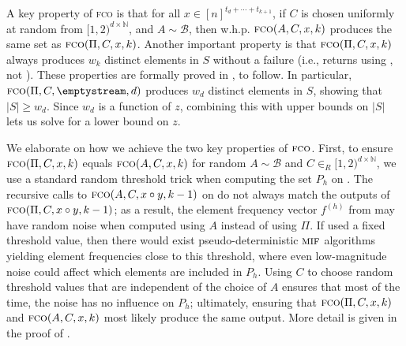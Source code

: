 \documentclass[10pt,a4paper]{article}
\theoremstyle{definition}
\theoremstyle{remark}
\newcommand{\NN}{\mathbb{N}}
\newcommand{\cB}{\mathcal{B}}
\newcommand{\mif}{\textsc{mif}\xspace}
\newcommand{\fco}{\textsc{fco}\xspace}
\newcommand{\concat}{\mathbin{\circ}}       %
\begin{document}
\begin{itemize}
\begin{itemize}
\begin{algorithm}[htb]
\end{algorithm}

A key property of \fco is that for all $x \in [n]^{t_d + \cdots + t_{k+1}}$,
if $C$ is chosen uniformly at random from $[1,2)^{d \times \NN}$, and $A \sim
\cB$, then w.h.p. $\fco(A, C, x, k)$ produces the same set as $\fco(\Pi, C, x,
k)$. Another important property is that $\fco(\Pi, C, x, k)$ always produces
$w_k$ distinct elements in $S$ without a failure (i.e., returns using
, not ). These properties
are formally proved in , to follow.  In
particular, $\fco(\Pi, C, \emptystream, d)$ produces $w_d$ distinct elements
in $S$, showing that $|S| \ge w_d$. Since $w_d$ is a function of $z$,
combining this with upper bounds on $|S|$ lets us solve for a lower bound on
$z$.

We elaborate on how we achieve the two key properties of $\fco$. First, to
ensure $\fco(\Pi,C,x,k)$ equals $\fco(A,C,x,k)$ for random $A \sim \cB$ and $C
\in_R [1,2)^{d \times \NN}$, we use a standard random threshold trick when
computing the set $P_h$ on . The recursive calls to
$\fco(A, C, x \concat y, k-1)$ on  do not always
match the outputs of $\fco(\Pi, C, x \concat y, k-1)$; as a result, the
element frequency vector $f^{(h)}$ from  may have
random noise when computed using $A$ instead of using $\Pi$. If
 used a fixed threshold value, then there would exist
pseudo-deterministic $\mif$ algorithms yielding element frequencies close to
this threshold, where even low-magnitude noise could affect which elements are
included in $P_h$.  Using $C$ to choose random threshold values that are
independent of the choice of $A$ ensures that most of the time, the noise has
no influence on $P_h$; ultimately, ensuring that $\fco(\Pi,C,x,k)$ and
$\fco(A,C,x,k)$ most likely produce the same output. More detail is given in
the proof of .


\end{itemize}
\end{itemize}
\end{document}
